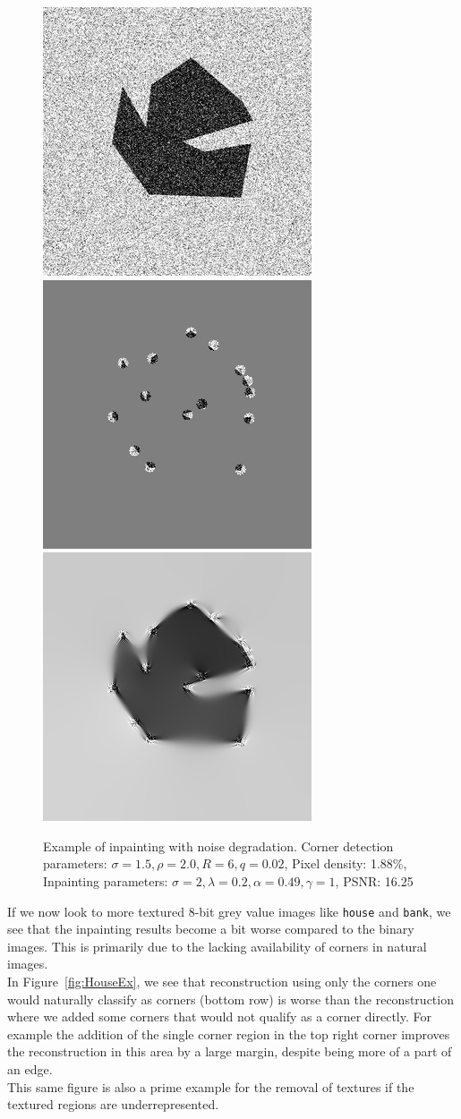 \begin{figure}[ht]
    \centering
    \includegraphics[width=0.29\linewidth]{../../images/binary/abstract1_noise.png}
    \includegraphics[width=0.29\linewidth]{../Images/abstract/abstract1_noise-mask.png}
    \includegraphics[width=0.29\linewidth]{../Images/abstract/abstract1_noise-inpaint.png}
    \caption{Example of inpainting with noise degradation. Corner detection parameters:
    $\sigma=1.5,\rho=2.0,R=6,q=0.02$, Pixel density: 1.88\%, Inpainting parameters:
$\sigma=2,\lambda=0.2,\alpha=0.49,\gamma=1$, PSNR\@: 16.25}\label{fig:AbstractNoise2}
\end{figure}                                       
If we now look to more textured 8-bit grey value images like \texttt{house} and \texttt{bank}, we
see that the inpainting results become a bit worse compared to the binary images. This is primarily
due to the lacking availability of corners in natural images.\\
In Figure~\ref{fig:HouseEx}, we see that reconstruction using only the corners one would naturally
classify as corners (bottom row) is worse than the reconstruction where we added some corners that
would not qualify as a corner directly. For example the addition of the single corner region in the
top right corner improves the reconstruction in this area by a large margin, despite being more of
a part of an edge.\\
This same figure is also a prime example for the removal of textures if the textured regions are
underrepresented.

